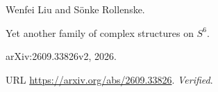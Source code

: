 Wenfei Liu and S{\"o}nke Rollenske.

\newblock Yet another family of complex structures on {$S^6$}.

\newblock arXiv:2609.33826v2, 2026.

\newblock URL \url{https://arxiv.org/abs/2609.33826}.
\newblock \emph{Verified}.

